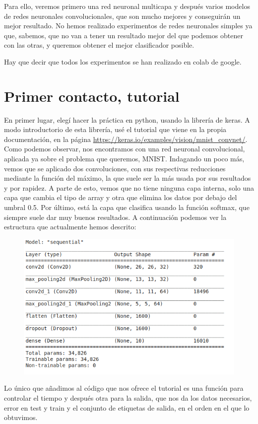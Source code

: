 Para ello, veremos primero una red neuronal multicapa y después varios modelos de redes neuronales convolucionales, que son mucho mejores y conseguirán un mejor resultado. No hemos realizado experimentos de redes neuronales simples ya que, sabemos, que no van a tener un resultado mejor del que podemos obtener con las otras, y queremos obtener el mejor clasificador posible.

Hay que decir que todos los experimentos se han realizado en colab de google.

\section{Primer contacto, tutorial}

En primer lugar, elegí hacer la práctica en python, usando la librería de keras. A modo introductorio de esta librería, usé el tutorial que viene en la propia documentación, en la página \url{https://keras.io/examples/vision/mnist_convnet/}. Como podemos observar, nos encontramos con una red neuronal convolucional, aplicada ya sobre el problema que queremos, MNIST. Indagando un poco más, vemos que se aplicado dos convoluciones, con sus respectivas reducciones mediante la función del máximo, la que suele ser la más usada por sus resultados y por rapidez. A parte de esto, vemos que no tiene ninguna capa interna, solo una capa que cambia el tipo de array y otra que elimina los datos por debajo del umbral 0.5. Por último, está la capa que clasifica usando la función softmax, que siempre suele dar muy buenos resultados. A continuación podemos ver la estructura que actualmente hemos descrito:

\begin{figure}[H]
	\centering
	\includegraphics[width=0.55\linewidth]{tutorial}
	\label{fig:tutorial}
\end{figure}

Lo único que añadimos al código que nos ofrece el tutorial es una función para controlar el tiempo y después otra para la salida, que nos da los datos necesarios, error en test y train y el conjunto de etiquetas de salida, en el orden en el que lo obtuvimos.

